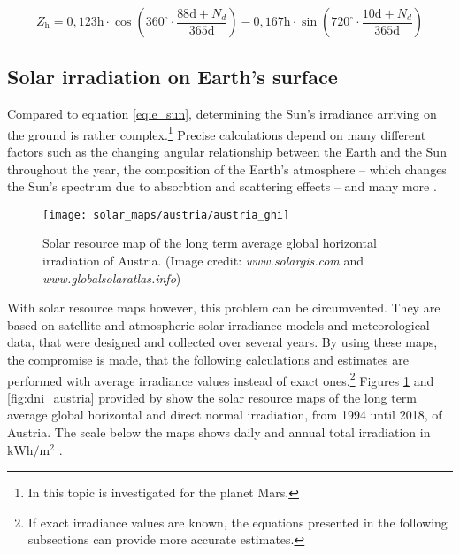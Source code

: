 \begin{center}
	\begin{equation} \label{eq:time_equation}
		Z_{\mathrm{h}} = 0,123\mathrm{h} \cdot \cos \left(360^\circ \cdot \frac{88\mathrm{d} + N_d}{365\mathrm{d}}\right) - 0,167\mathrm{h} \cdot \sin \left(720^\circ \cdot \frac{10\mathrm{d} + N_d}{365\mathrm{d}}\right) 
	\end{equation}
\end{center}

%
%
%


\subsection{Solar irradiation on Earth's surface} \label{sec:solar_irradiation_on_earths_surface}
Compared to equation \ref{eq:e_sun}, determining the Sun's irradiance arriving on the ground is rather complex.\footnote{In \cite{Appelbaum:1989, Appelbaum:1992} this topic is investigated for the planet Mars.} Precise calculations depend on many different factors such as the changing angular relationship between the Earth and the Sun throughout the year, the composition of the Earth's atmosphere -- which changes the Sun's spectrum due to absorbtion and scattering effects -- and many more \cite{Appelbaum:1993, Mertens:2015, Wagner:2018}. 

\begin{figure}[h!]
	\centering
  	\texttt{[image: solar\_maps/austria/austria\_ghi]}
  	\caption{Solar resource map of the long term average global horizontal irradiation of Austria. (Image credit: \emph{www.solargis.com} and \emph{www.globalsolaratlas.info})}
	\label{fig:ghi_austria}
\end{figure}

With solar resource maps however, this problem can be circumvented. They are based on satellite and atmospheric solar irradiance models and meteorological data, that were designed and collected over several years. By using these maps, the compromise is made, that the following calculations and estimates are performed with average irradiance values instead of exact ones.\footnote{If exact irradiance values are known, the equations presented in the following subsections can provide more accurate estimates.} Figures \ref{fig:ghi_austria} and \ref{fig:dni_austria} provided by \cite{SolargisMaps:2020, GlobalSolarAtlas:2020} show the solar resource maps of the long term average global horizontal and direct normal irradiation, from 1994 until 2018, of Austria. The scale below the maps shows daily and annual total irradiation in $\mathrm{kWh}/\mathrm{m}^2$ \cite{MeteorologicalModeling:2020, SolarRadiationModeling:2020, SolargisData:2020}. 


